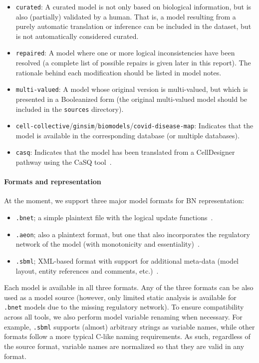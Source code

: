 \documentclass{article}
\begin{document}
\begin{itemize}
	\item \texttt{curated}: A curated model is not only based on biological information, but is also (partially) validated by a human. That is, a model resulting from a purely automatic translation or inference can be included in the dataset, but is not automatically considered curated.
	\item \texttt{repaired}: A model where one or more logical inconsistencies have been resolved (a complete list of possible repairs is given later in this report). The rationale behind each modification should be listed in model notes.
	\item \texttt{multi-valued}: A model whose original version is multi-valued, but which is presented in a Booleanized form (the original multi-valued model should be included in the \texttt{sources} directory).
	\item \texttt{cell-collective}/\texttt{ginsim}/\texttt{biomodels}/\texttt{covid-disease-map}: Indicates that the model is available in the corresponding database (or multiple databases).
	\item \texttt{casq}: Indicates that the model has been translated from a CellDesigner pathway using the CaSQ tool~\cite{casq}.
\end{itemize}

\paragraph{Formats and representation} At the moment, we support three major model formats for BN representation: 

\begin{itemize}
	\item \texttt{.bnet}; a simple plaintext file with the logical update functions~\cite{pyboolnet}.
	\item \texttt{.aeon}; also a plaintext format, but one that also incorporates the regulatory network of the model (with monotonicity and essentiality)~\cite{aeon}.
	\item \texttt{.sbml}; XML-based format with support for additional meta-data (model layout, entity references and comments, etc.)~\cite{sbml-qual}.
\end{itemize}

Each model is available in all three formats. Any of the three formats can be also used as a model source (however, only limited static analysis is available for \texttt{.bnet} models due to the missing regulatory network). To ensure compatibility across all tools, we also perform model variable renaming when necessary. For example, \texttt{.sbml} supports (almost) arbitrary strings as variable names, while other formats follow a more typical C-like naming requirements. As such, regardless of the source format, variable names are normalized so that they are valid in any format.
\end{document}
